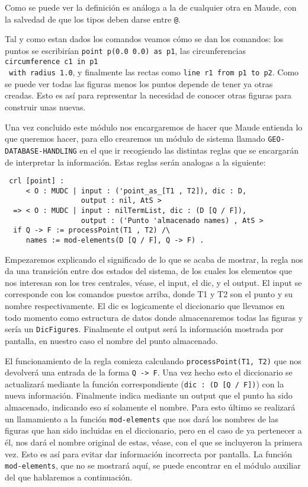 Como se puede ver la definición es análoga a la de cualquier otra en Maude, con la salvedad de que los tipos deben darse entre \verb"@". \par 

Tal y como estan dados los comandos veamos cómo se dan los comandos: los puntos se escribirían \verb"point p(0.0 0.0) as p1", las circunferencias \verb"circumference c1 in p1" \\ \verb" with radius 1.0", y finalmente las rectas como \verb"line r1 from p1 to p2". Como se puede ver todas las figuras menos los puntos depende de tener ya otras creadas. Esto es así para representar la necesidad de conocer otras figuras para construir unas nuevas.\par

Una vez concluido este módulo nos encargaremos de hacer que Maude entienda lo que queremos hacer, para ello crearemos un módulo de sistema llamado \verb"GEO-DATABASE-HANDLING" en el que ir recogiendo las distintas reglas que se encargarán de interpretar la información. Estas reglas serán analogas a la siguiente:\par

{\codesize
\begin{verbatim}
 crl [point] :
     < O : MUDC | input : ('point_as_[T1 , T2]), dic : D,
                  output : nil, AtS >
  => < O : MUDC | input : nilTermList, dic : (D [Q / F]),
                  output : ('Punto 'almacenado names) , AtS >
  if Q -> F := processPoint(T1 , T2) /\
     names := mod-elements(D [Q / F], Q -> F) .
\end{verbatim}
}
Empezaremos explicando el significado de lo que se acaba de mostrar, la regla nos da una transición entre dos estados del sistema, de los cuales los elementos que nos interesan son los tres centrales, véase, el input, el dic, y el output. El input se corresponde con los comandos puestos arriba, donde T1 y T2 son el punto y su nombre respectivamente. El dic es logicamente el diccionario que llevamos en todo momento como estructura de datos donde almacenaremos todas las figuras y sería un \verb"DicFigures". Finalmente el output será la información mostrada por pantalla, en nuestro caso el nombre del punto almacenado. \par

El funcionamiento de la regla comieza calculando \texttt{processPoint(T1, T2)} que nos devolverá una entrada de la forma \texttt{Q -> F}. Una vez hecho esto el diccionario se actualizará mediante la función correspondiente (\verb"dic : (D [Q / F])") con la nueva información. Finalmente indica mediante un output que el punto ha sido almacenado, indicando eso sí solamente el nombre. Para esto último se realizará un llamamiento a la función \texttt{mod-elements} que nos dará los nombres de las figuras que han sido incluidas en el diccionario, pero en el caso de ya pertenecer a él, nos dará el nombre original de estas, véase, con el que se incluyeron la primera vez. Esto es así para evitar dar información incorrecta por pantalla. La función \texttt{mod-elements}, que no se mostrará aquí, se puede encontrar en el módulo auxiliar del que hablaremos a continuación.\par

